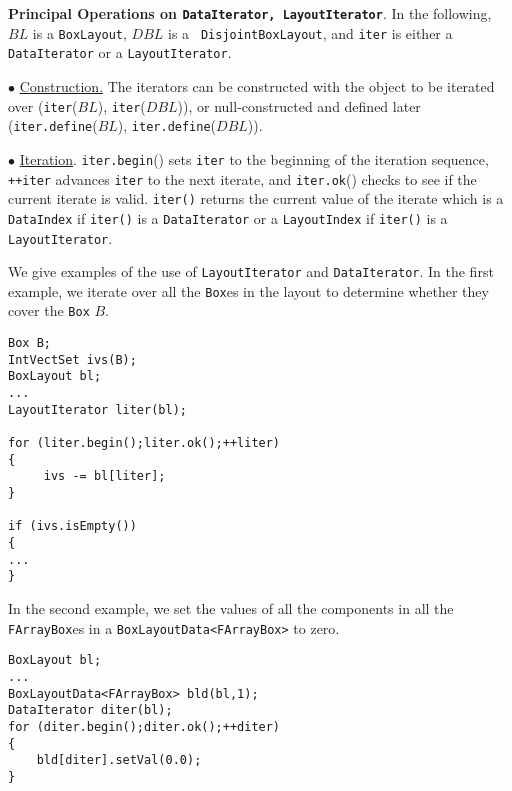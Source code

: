 \noindent
{\bf{Principal Operations on {\tt{DataIterator}, {\tt LayoutIterator}}}}.
In the following, $BL$ is a {\tt BoxLayout}, $DBL$ is a {\tt
DisjointBoxLayout}, and {\tt iter} is either a {\tt DataIterator} or a
{\tt LayoutIterator}.

\begin{trivlist}

\item $\bullet$ \underline{Construction.} 
The iterators can be
constructed with the object to be iterated over ({\tt{iter}}($BL$),
{\tt{iter}}($DBL$)), or null-constructed and defined later
({\tt{iter.define}}($BL$), {\tt{iter.define}}($DBL$)).

\item $\bullet$ \underline{Iteration}.  
{\tt{iter.begin}}() sets
{\tt{iter}} to the beginning of the iteration sequence, {\tt{++iter}}
advances {\tt{iter}} to the next iterate, and {\tt{iter.ok}}() checks to
see if the current iterate is valid.  
{\tt iter()} returns the current value of the iterate which is
a {\tt DataIndex} if {\tt iter()} is a {\tt DataIterator} or
a {\tt LayoutIndex} if {\tt iter()} is a {\tt LayoutIterator}.
\end{trivlist}

We give examples of the use of {\tt LayoutIterator} and 
{\tt DataIterator}. In the first example, we iterate over all the 
{\tt Box}es in the layout to determine whether they cover the {\tt Box} 
$B$.
\begin{verbatim}
Box B;
IntVectSet ivs(B);
BoxLayout bl;
...
LayoutIterator liter(bl);

for (liter.begin();liter.ok();++liter)
{
     ivs -= bl[liter];
}

if (ivs.isEmpty()) 
{ 
...
}
\end{verbatim}
In the second example, we set the values of all the components in all the {\tt FArrayBox}es in a
{\tt BoxLayoutData<FArrayBox>} to zero.
\begin{verbatim}
BoxLayout bl;
...
BoxLayoutData<FArrayBox> bld(bl,1);
DataIterator diter(bl);
for (diter.begin();diter.ok();++diter)
{
    bld[diter].setVal(0.0);
}
\end{verbatim}
